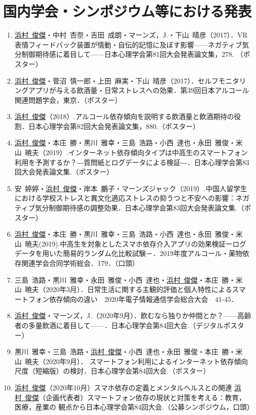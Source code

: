 \documentclass{article}
\begin{document}
\section{国内学会・シンポジウム等における発表}
\begin{enumerate}
	\item \underline{浜村\ 俊傑}・中村\ 杏奈・吉田\ 成朗・マーンズ，J.・下山\ 晴彦（2017）．VR表情フィードバック装置が情動・自伝的記憶に及ぼす影響——ネガティブ気分制御期待感に着目して——日本心理学会第81回大会発表論文集，278. （ポスター）
	\item \underline{浜村\ 俊傑}・菅沼\ 慎一郎・上田\ 麻実・下山\ 晴彦（2017）．セルフモニタリングアプリが与える飲酒量・日常ストレスへの効果．第39回日本アルコール関連問題学会，東京．（ポスター）
	\item \underline{浜村\ 俊傑}（2018）.アルコール依存傾向を説明する飲酒量と飲酒期待の役割．日本心理学会第82回大会発表論文集，880.（ポスター）
	\item \underline{浜村\ 俊傑}・本庄\ 勝・黒川\ 雅幸・三島\ 浩路・小西\ 達也・永田\ 雅俊・米山\ 暁夫（2019）.インターネット依存傾向タイプは中高生のスマートフォン利用を予測するか？―質問紙とログデータによる検証―．日本心理学会第83回大会発表論文集.（ポスター）
	\item 安\ 婷婷・\underline{浜村\ 俊傑}・岸本\ 鵬子・マーンズジャック（2019）.中国人留学生における学校ストレスと異文化適応ストレスの抑うつと不安への影響：ネガティブ気分制御期待感の調整効果．日本心理学会第83回大会発表論文集.（ポスター）
	\item\underline{浜村\ 俊傑}・本庄\ 勝・黒川\ 雅幸・三島\ 浩路・小西\ 達也・永田\ 雅俊・米山\ 暁夫(2019).中高生を対象としたスマホ依存介入アプリの効果検証ーログデータを用いた簡易的ランダム化比較試験－．2019年度アルコール・薬物依存関連学会合同学術総会．179．（口頭）
	\item 三島\ 浩路・黒川\ 雅幸・永田\ 雅俊・小西\ 達也・\underline{浜村\ 俊傑}・本庄\ 勝・米山\ 暁夫（2020年3月）．日常生活に関する主観的評価と個人特性によるスマートフォン依存傾向の違い　2020年電子情報通信学会総合大会　41-45．　
	\item \underline{浜村\ 俊傑}・マーンズ，J.（2020年9月）．飲むなら独りか仲間とか？——高齢者の多量飲酒に着目して——．日本心理学会第84回大会.（デジタルポスター）
	\item 黒川\ 雅幸・三島\ 浩路・\underline{浜村\ 俊傑}・小西\ 達也・永田\ 雅俊・本庄\ 勝・米山\ 暁夫（2020年9月）．	スマートフォン利用によるインターネット依存傾向尺度（短縮版）の検討．日本心理学会第84回大会.（ポスター）
	\item \underline{浜村\ 俊傑}（2020年10月）スマホ依存の定義とメンタルヘルスとの関連	\underline{浜村\ 俊傑}（企画代表者）スマートフォン依存の現状と対策を考える：教育，医療，産業の	観点から日本心理学会第84回大会.（公募シンポジウム，口頭）

\end{enumerate}
\end{document}
